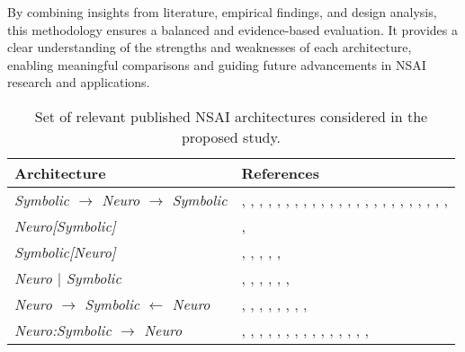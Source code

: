 \documentclass[12pt]{article}
\begin{document}
 By combining insights from literature, empirical findings, and design analysis, this methodology ensures a balanced and evidence-based evaluation. It provides a clear understanding of the strengths and weaknesses of each architecture, enabling meaningful comparisons and guiding future advancements in NSAI research and applications.

\begin{table}[h]
    \centering
        \caption{Set of relevant published NSAI architectures considered in the proposed study.}

    \begin{tabular}{|l|p{10cm}|}
        \hline
        \textbf{Architecture} & \textbf{References} \\
        \hline
        \textit{Symbolic $\to$ Neuro $\to$ Symbolic} & \cite{kouris2021abstractive}, \cite{sutherland2019leveraging}, \cite{gu2019local}, \cite{cui2021sememes}, \cite{xu2019relation}, \cite{cowen2019neural}, \cite{bounabi2021new}, \cite{es2021sentence}, \cite{lima2019impact}, \cite{zhou2021relation}, \cite{gong2020hierarchical}, \cite{tato2019hybrid}, \cite{langton2021applied}, \cite{bracsoveanu2019semantic}, \cite{pinhanez2021using}, \cite{dehua2021bdcn}, \cite{fazlic2019novel}, \cite{d2019team}, \cite{ayyanar2019causal}, \cite{hu2021dialoguecrn}, \cite{chen2020question}, \cite{manda2020automated}, \cite{honda2019question}, \cite{schon2019corg}, \cite{amin2019cases} \\
        \hline
        \textit{Neuro[Symbolic]} & \cite{heule2016solving}, \cite{madan2021fast} \\
        \hline
        \textit{Symbolic[Neuro]} & \cite{silver2016mastering}, \cite{chen2021web}, \cite{chen2021neurallog}, \cite{pacheco2021modeling}, \cite{chaturvedi2019fuzzy}, \cite{qin2021neural} \\
        \hline
        \textit{Neuro $|$ Symbolic} & \cite{mao2019neuro}, \cite{yao2018learning}, \cite{shi2021neural}, \cite{vskrlj2021autobot}, \cite{wang2021variational}, \cite{lemos2020neural}, \cite{huang2019attentive} \\
        \hline
        \textit{Neuro $\to$ Symbolic $\leftarrow$ Neuro} & \cite{das2021case}, \cite{garcez2004fibring}, \cite{belle2023neuro}, \cite{guo2025deepseek}, \cite{jiang2024mixtral}, \cite{guo2024large}, \cite{maldonado2024multi}, \cite{he2024mixturemillionexperts}, \cite{lo2024closerlookmixtureofexpertslarge} \\
        \hline
        \textit{Neuro:Symbolic $\to$ Neuro} & \cite{lample2019deep}, \cite{yabloko2020ethan}, \cite{zhou2020temporal}, \cite{saveleva2021graph}, \cite{gupta2021neuro}, \cite{demeter2020just}, \cite{jiang2021lnn}, \cite{kogkalidis2020neural}, \cite{zhang2021noahqa}, \cite{sen2020learning}, \cite{huo2019graph}, \cite{jiang2020medical}, \cite{liu2021heterogeneous}, \cite{chaudhury2021neuro}, \cite{verga2020facts}, \cite{socher2013reasoning}\\

\end{tabular}
\end{table}
\end{document}
